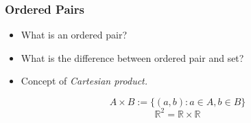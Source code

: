 \documentclass{beamer}
\newcommand{\myfont}{\rmfamily\normalsize\upshape\mdseries}
\begin{document}
\begin{frame}
    \frametitle{Ordered Pairs}
\begin{itemize}
    \item What is an ordered pair?
    \item What is the difference between ordered pair and set?
    \item Concept of \itshape{Cartesian product}\myfont.
\end{itemize}
\vspace{1em}
$$A \times B := \{(a,b):a \in A, b \in B\}$$
$$\mathbb{R}^2=\mathbb{R} \times \mathbb{R}$$
\vspace*{7em}
\end{frame}
%                                           
\end{document}
